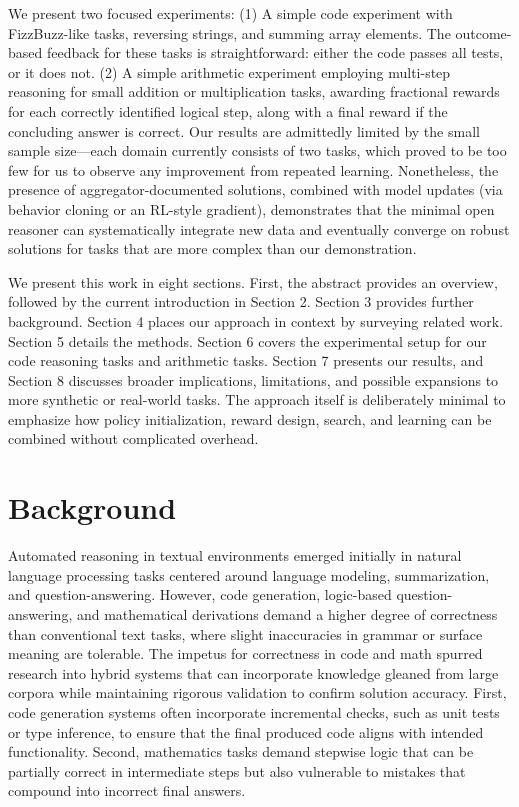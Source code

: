 \documentclass{article}
\begin{document}
We present two focused experiments: (1) A simple code experiment with FizzBuzz-like tasks, reversing strings, and summing array elements. The outcome-based feedback for these tasks is straightforward: either the code passes all tests, or it does not. (2) A simple arithmetic experiment employing multi-step reasoning for small addition or multiplication tasks, awarding fractional rewards for each correctly identified logical step, along with a final reward if the concluding answer is correct. Our results are admittedly limited by the small sample size—each domain currently consists of two tasks, which proved to be too few for us to observe any improvement from repeated learning. Nonetheless, the presence of aggregator-documented solutions, combined with model updates (via behavior cloning or an RL-style gradient), demonstrates that the minimal open reasoner can systematically integrate new data and eventually converge on robust solutions for tasks that are more complex than our demonstration.

We present this work in eight sections. First, the abstract provides an overview, followed by the current introduction in Section 2. Section 3 provides further background. Section 4 places our approach in context by surveying related work. Section 5 details the methods. Section 6 covers the experimental setup for our code reasoning tasks and arithmetic tasks. Section 7 presents our results, and Section 8 discusses broader implications, limitations, and possible expansions to more synthetic or real-world tasks. The approach itself is deliberately minimal to emphasize how policy initialization, reward design, search, and learning can be combined without complicated overhead.

\section{Background}
Automated reasoning in textual environments emerged initially in natural language processing tasks centered around language modeling, summarization, and question-answering. However, code generation, logic-based question-answering, and mathematical derivations demand a higher degree of correctness than conventional text tasks, where slight inaccuracies in grammar or surface meaning are tolerable. The impetus for correctness in code and math spurred research into hybrid systems that can incorporate knowledge gleaned from large corpora while maintaining rigorous validation to confirm solution accuracy. First, code generation systems often incorporate incremental checks, such as unit tests or type inference, to ensure that the final produced code aligns with intended functionality. Second, mathematics tasks demand stepwise logic that can be partially correct in intermediate steps but also vulnerable to mistakes that compound into incorrect final answers.
\end{document}
